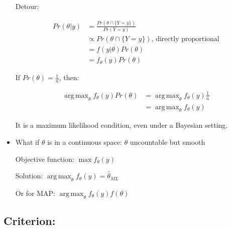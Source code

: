 \documentclass[11pt,letterpaper,titlepage]{article}
\DeclareMathOperator*{\argmax}{arg\,max}
\begin{document}
\begin{itemize}
    Detour:
    
    \begin{equation*}
        \begin{aligned}
            Pr(\theta|y) &= \frac{Pr(\theta \cap \{Y = y\})}{Pr(Y = y)} \\
            &\propto Pr(\theta \cap \{Y = y\}) \text{, directly proportional} \\
            &= f(y|\theta) Pr(\theta) \\
            &= f_{\theta}(y) Pr(\theta)
        \end{aligned}
    \end{equation*}
    
    If $Pr(\theta) = \frac{1}{n}$, then:
    
    \begin{equation*}
        \begin{aligned}
            \argmax_{\theta} f_{\theta}(y) Pr(\theta) &= \argmax_{\theta} f_{\theta}(y) \frac{1}{n} \\
            &= \argmax_{\theta} f_{\theta}(y)
        \end{aligned}
    \end{equation*}
    
    It is a maximum likelihood condition, even under a Bayesian setting.
    
    \item What if $\theta$ is in a continuous space: $\theta$ uncountable but smooth
    
    Objective function: $\max f_{\theta}(y)$
    
    Solution: $\argmax_{\theta} f_{\theta}(y) = \hat{\theta}_{ML}$
    
    Or for MAP: $\argmax_{\theta} f_{\theta}(y) f(\theta)$
    
\end{itemize}

\subsection{Criterion:}
\end{document}
